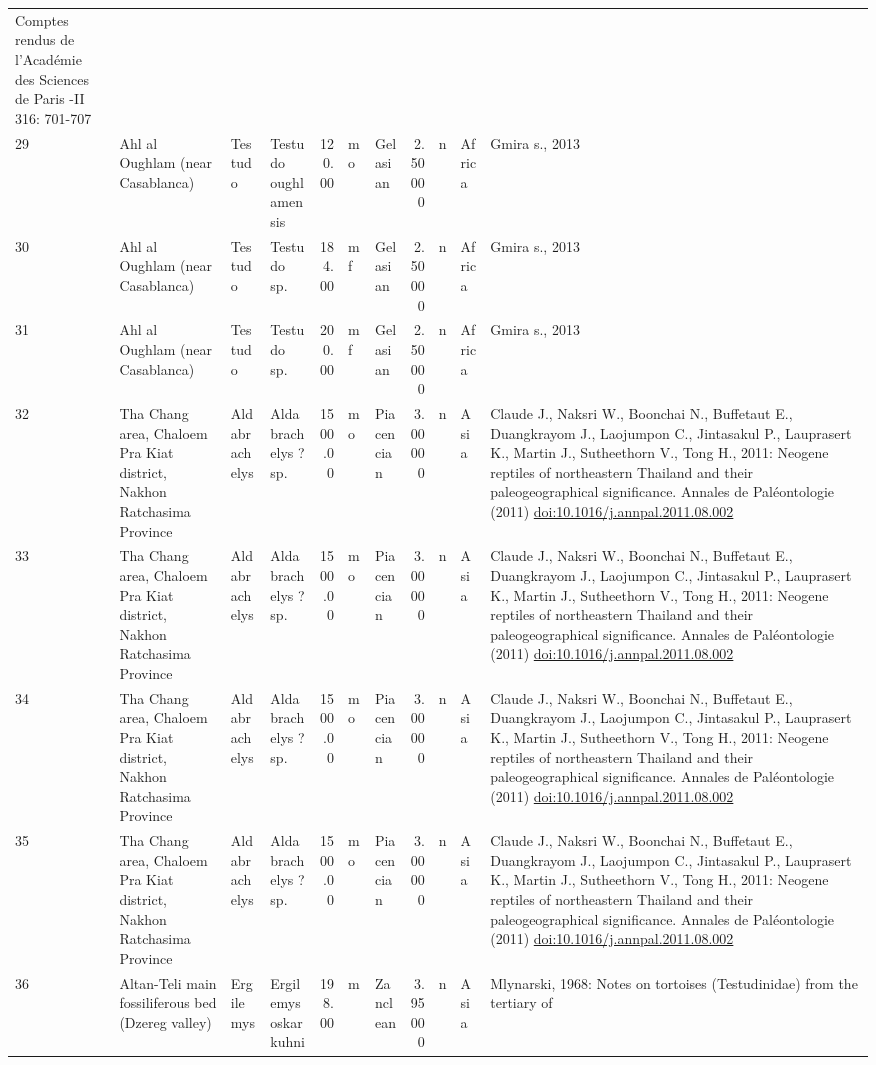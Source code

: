 \documentclass[]{article}
\begin{document}
\begin{longtable}[]{@{}llllrllrlll@{}}
Comptes rendus de l'Académie des Sciences de Paris -II 316:
701-707\tabularnewline
29 & Ahl al Oughlam (near Casablanca) & Testudo & Testudo oughlamensis &
120.00 & mo & Gelasian & 2.50000 & n & Africa & Gmira s.,
2013\tabularnewline
30 & Ahl al Oughlam (near Casablanca) & Testudo & Testudo sp. & 184.00 &
mf & Gelasian & 2.50000 & n & Africa & Gmira s., 2013\tabularnewline
31 & Ahl al Oughlam (near Casablanca) & Testudo & Testudo sp. & 200.00 &
mf & Gelasian & 2.50000 & n & Africa & Gmira s., 2013\tabularnewline
32 & Tha Chang area, Chaloem Pra Kiat district, Nakhon Ratchasima
Province & Aldabrachelys & Aldabrachelys ? sp. & 1500.00 & mo &
Piacencian & 3.00000 & n & Asia & Claude J., Naksri W., Boonchai N.,
Buffetaut E., Duangkrayom J., Laojumpon C., Jintasakul P., Lauprasert
K., Martin J., Sutheethorn V., Tong H., 2011: Neogene reptiles of
northeastern Thailand and their paleogeographical significance. Annales
de Paléontologie (2011)
\url{doi:10.1016/j.annpal.2011.08.002}\tabularnewline
33 & Tha Chang area, Chaloem Pra Kiat district, Nakhon Ratchasima
Province & Aldabrachelys & Aldabrachelys ? sp. & 1500.00 & mo &
Piacencian & 3.00000 & n & Asia & Claude J., Naksri W., Boonchai N.,
Buffetaut E., Duangkrayom J., Laojumpon C., Jintasakul P., Lauprasert
K., Martin J., Sutheethorn V., Tong H., 2011: Neogene reptiles of
northeastern Thailand and their paleogeographical significance. Annales
de Paléontologie (2011)
\url{doi:10.1016/j.annpal.2011.08.002}\tabularnewline
34 & Tha Chang area, Chaloem Pra Kiat district, Nakhon Ratchasima
Province & Aldabrachelys & Aldabrachelys ? sp. & 1500.00 & mo &
Piacencian & 3.00000 & n & Asia & Claude J., Naksri W., Boonchai N.,
Buffetaut E., Duangkrayom J., Laojumpon C., Jintasakul P., Lauprasert
K., Martin J., Sutheethorn V., Tong H., 2011: Neogene reptiles of
northeastern Thailand and their paleogeographical significance. Annales
de Paléontologie (2011)
\url{doi:10.1016/j.annpal.2011.08.002}\tabularnewline
35 & Tha Chang area, Chaloem Pra Kiat district, Nakhon Ratchasima
Province & Aldabrachelys & Aldabrachelys ? sp. & 1500.00 & mo &
Piacencian & 3.00000 & n & Asia & Claude J., Naksri W., Boonchai N.,
Buffetaut E., Duangkrayom J., Laojumpon C., Jintasakul P., Lauprasert
K., Martin J., Sutheethorn V., Tong H., 2011: Neogene reptiles of
northeastern Thailand and their paleogeographical significance. Annales
de Paléontologie (2011)
\url{doi:10.1016/j.annpal.2011.08.002}\tabularnewline
36 & Altan-Teli main fossiliferous bed (Dzereg valley) & Ergilemys &
Ergilemys oskarkuhni & 198.00 & m & Zanclean & 3.95000 & n & Asia &
Mlynarski, 1968: Notes on tortoises (Testudinidae) from the tertiary of

\end{longtable}
\end{document}
